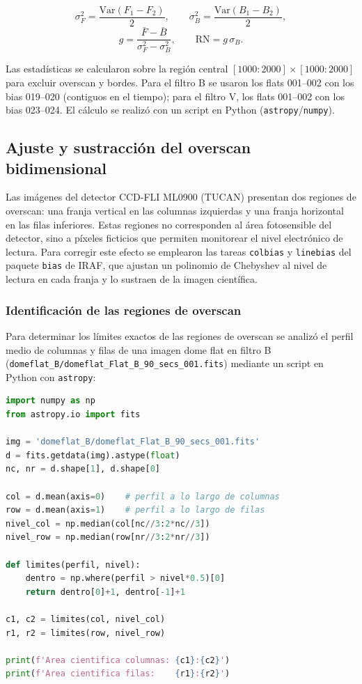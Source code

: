 \documentclass[10pt,a4paper,twocolumn]{article}
\begin{document}
\begin{equation}
\sigma^2_F = \frac{\mathrm{Var}(F_1-F_2)}{2}, \qquad
\sigma^2_B = \frac{\mathrm{Var}(B_1-B_2)}{2},
\end{equation}
\begin{equation}
g = \frac{\bar{F}-\bar{B}}{\sigma^2_F-\sigma^2_B}, \qquad
\mathrm{RN} = g\,\sigma_B .
\end{equation}

\noindent Las estadísticas se calcularon sobre la región central
$[1000:2000]\times[1000:2000]$ para excluir overscan y bordes. Para el filtro B
se usaron los flats 001--002 con los bias 019--020 (contiguos en el tiempo);
para el filtro V, los flats 001--002 con los bias 023--024. El cálculo se
realizó con un script en Python (\texttt{astropy}/\texttt{numpy}).

\subsection{Ajuste y sustracción del overscan bidimensional}
Las imágenes del detector CCD-FLI ML0900 (TUCAN) presentan dos regiones de
overscan: una franja vertical en las columnas izquierdas y una franja
horizontal en las filas inferiores. Estas regiones no corresponden al área
fotosensible del detector, sino a píxeles ficticios que permiten monitorear
el nivel electrónico de lectura. Para corregir este efecto se emplearon las
tareas \texttt{colbias} y \texttt{linebias} del paquete \texttt{bias} de
IRAF, que ajustan un polinomio de Chebyshev al nivel de lectura en cada
franja y lo sustraen de la imagen científica.

\subsubsection{Identificación de las regiones de overscan}

Para determinar los límites exactos de las regiones de overscan se analizó
el perfil medio de columnas y filas de una imagen dome flat en filtro B
(\texttt{domeflat\_B/domeflat\_Flat\_B\_90\_secs\_001.fits}) mediante un
script en Python con \texttt{astropy}:

\begin{lstlisting}[language=Python]
import numpy as np
from astropy.io import fits

img = 'domeflat_B/domeflat_Flat_B_90_secs_001.fits'
d = fits.getdata(img).astype(float)
nc, nr = d.shape[1], d.shape[0]

col = d.mean(axis=0)    # perfil a lo largo de columnas
row = d.mean(axis=1)    # perfil a lo largo de filas
nivel_col = np.median(col[nc//3:2*nc//3])
nivel_row = np.median(row[nr//3:2*nr//3])

def limites(perfil, nivel):
    dentro = np.where(perfil > nivel*0.5)[0]
    return dentro[0]+1, dentro[-1]+1

c1, c2 = limites(col, nivel_col)
r1, r2 = limites(row, nivel_row)

print(f'Area cientifica columnas: {c1}:{c2}')
print(f'Area cientifica filas:    {r1}:{r2}')
\end{lstlisting}
\end{document}
